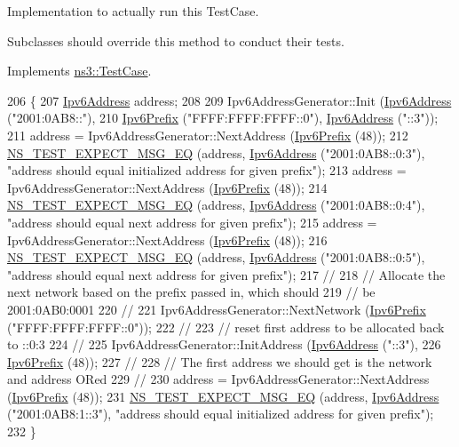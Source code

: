 Implementation to actually run this Test\+Case. 

Subclasses should override this method to conduct their tests. 

Implements \hyperlink{classns3_1_1TestCase_a8ff74680cf017ed42011e4be51917a24}{ns3\+::\+Test\+Case}.


\begin{DoxyCode}
206 \{
207   \hyperlink{classns3_1_1Ipv6Address}{Ipv6Address} address;
208 
209   Ipv6AddressGenerator::Init (\hyperlink{classns3_1_1Ipv6Address}{Ipv6Address} (\textcolor{stringliteral}{"2001:0AB8::"}),
210                               \hyperlink{classns3_1_1Ipv6Prefix}{Ipv6Prefix} (\textcolor{stringliteral}{"FFFF:FFFF:FFFF::0"}), 
      \hyperlink{classns3_1_1Ipv6Address}{Ipv6Address} (\textcolor{stringliteral}{"::3"}));
211   address = Ipv6AddressGenerator::NextAddress (\hyperlink{classns3_1_1Ipv6Prefix}{Ipv6Prefix} (48));
212   \hyperlink{group__testing_ga7304ba46a28d8cf08dfdfd6499cf7068}{NS\_TEST\_EXPECT\_MSG\_EQ} (address, \hyperlink{classns3_1_1Ipv6Address}{Ipv6Address} (\textcolor{stringliteral}{"2001:0AB8::0:3"}), \textcolor{stringliteral}{"address
       should equal initialized address for given prefix"});
213   address = Ipv6AddressGenerator::NextAddress (\hyperlink{classns3_1_1Ipv6Prefix}{Ipv6Prefix} (48));
214   \hyperlink{group__testing_ga7304ba46a28d8cf08dfdfd6499cf7068}{NS\_TEST\_EXPECT\_MSG\_EQ} (address, \hyperlink{classns3_1_1Ipv6Address}{Ipv6Address} (\textcolor{stringliteral}{"2001:0AB8::0:4"}), \textcolor{stringliteral}{"address
       should equal next address for given prefix"});
215   address = Ipv6AddressGenerator::NextAddress (\hyperlink{classns3_1_1Ipv6Prefix}{Ipv6Prefix} (48));
216   \hyperlink{group__testing_ga7304ba46a28d8cf08dfdfd6499cf7068}{NS\_TEST\_EXPECT\_MSG\_EQ} (address, \hyperlink{classns3_1_1Ipv6Address}{Ipv6Address} (\textcolor{stringliteral}{"2001:0AB8::0:5"}), \textcolor{stringliteral}{"address
       should equal next address for given prefix"});
217   \textcolor{comment}{//}
218   \textcolor{comment}{// Allocate the next network based on the prefix passed in, which should}
219   \textcolor{comment}{// be 2001:0AB0:0001}
220   \textcolor{comment}{//}
221   Ipv6AddressGenerator::NextNetwork (\hyperlink{classns3_1_1Ipv6Prefix}{Ipv6Prefix} (\textcolor{stringliteral}{"FFFF:FFFF:FFFF::0"}));
222   \textcolor{comment}{//}
223   \textcolor{comment}{// reset first address to be allocated back to ::0:3}
224   \textcolor{comment}{//}
225   Ipv6AddressGenerator::InitAddress (\hyperlink{classns3_1_1Ipv6Address}{Ipv6Address} (\textcolor{stringliteral}{"::3"}),
226                                      \hyperlink{classns3_1_1Ipv6Prefix}{Ipv6Prefix} (48));
227   \textcolor{comment}{//}
228   \textcolor{comment}{// The first address we should get is the network and address ORed}
229   \textcolor{comment}{//}
230   address = Ipv6AddressGenerator::NextAddress (\hyperlink{classns3_1_1Ipv6Prefix}{Ipv6Prefix} (48));
231   \hyperlink{group__testing_ga7304ba46a28d8cf08dfdfd6499cf7068}{NS\_TEST\_EXPECT\_MSG\_EQ} (address, \hyperlink{classns3_1_1Ipv6Address}{Ipv6Address} (\textcolor{stringliteral}{"2001:0AB8:1::3"}), \textcolor{stringliteral}{"address
       should equal initialized address for given prefix"});
232 \}
\end{DoxyCode}
